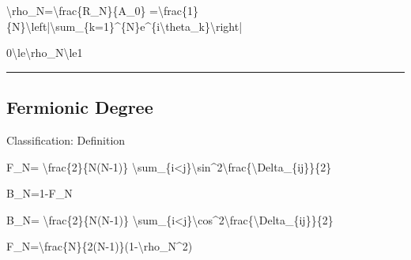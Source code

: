 \documentclass[
  a4paper,
]{article}
\newenvironment{Shaded}{}{}
\newcommand{\NormalTok}[1]{#1}
\begin{document}
\begin{Shaded}
\begin{Highlighting}[]
\NormalTok{\textbackslash{}rho\_N=\textbackslash{}frac\{R\_N\}\{A\_0\}}
\NormalTok{=\textbackslash{}frac\{1\}\{N\}\textbackslash{}left|\textbackslash{}sum\_\{k=1\}\^{}\{N\}e\^{}\{i\textbackslash{}theta\_k\}\textbackslash{}right|}
\end{Highlighting}
\end{Shaded}

\begin{Shaded}
\begin{Highlighting}[]
\NormalTok{0\textbackslash{}le\textbackslash{}rho\_N\textbackslash{}le1}
\end{Highlighting}
\end{Shaded}

\begin{center}\rule{0.5\linewidth}{0.5pt}\end{center}

\subsection{Fermionic Degree}\label{fermionic-degree}

Classification: Definition

\begin{Shaded}
\begin{Highlighting}[]
\NormalTok{F\_N=}
\NormalTok{\textbackslash{}frac\{2\}\{N(N{-}1)\}}
\NormalTok{\textbackslash{}sum\_\{i\textless{}j\}\textbackslash{}sin\^{}2\textbackslash{}frac\{\textbackslash{}Delta\_\{ij\}\}\{2\}}
\end{Highlighting}
\end{Shaded}

\begin{Shaded}
\begin{Highlighting}[]
\NormalTok{B\_N=1{-}F\_N}
\end{Highlighting}
\end{Shaded}

\begin{Shaded}
\begin{Highlighting}[]
\NormalTok{B\_N=}
\NormalTok{\textbackslash{}frac\{2\}\{N(N{-}1)\}}
\NormalTok{\textbackslash{}sum\_\{i\textless{}j\}\textbackslash{}cos\^{}2\textbackslash{}frac\{\textbackslash{}Delta\_\{ij\}\}\{2\}}
\end{Highlighting}
\end{Shaded}

\begin{Shaded}
\begin{Highlighting}[]
\NormalTok{F\_N=\textbackslash{}frac\{N\}\{2(N{-}1)\}(1{-}\textbackslash{}rho\_N\^{}2)}
\end{Highlighting}
\end{Shaded}
\end{document}
